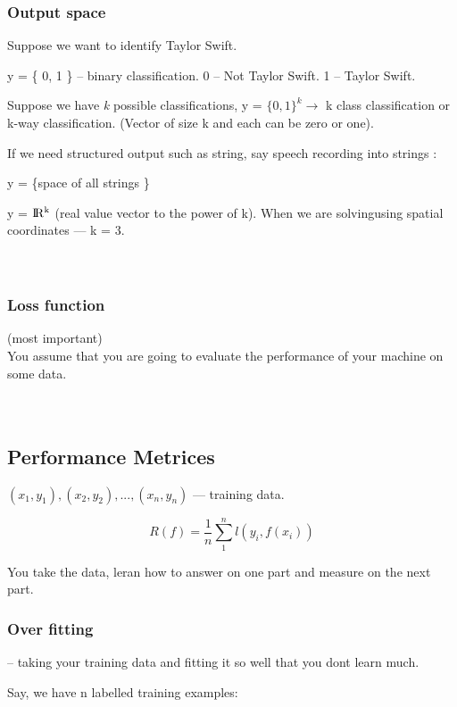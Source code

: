 \documentclass{article}
\begin{document}
\subsubsection*{Output space}

Suppose we want to identify Taylor Swift.

y = \{ 0, 1 \} -- binary classification.
0 -- Not Taylor Swift.
1 -- Taylor Swift.

Suppose we have \textit{k} possible classifications, 
y = \(\{0,1\}^{k} \to \) k class classification or k-way classification. (Vector of size k and each can be zero or one).


If we need structured output such as string, say speech recording into strings :

y = \{space of all strings \}

y = \( \rm I\!R^{k} \) (real value vector to the power of k).  When we are solvingusing spatial coordinates --- k = 3. \\\\\\
\subsubsection*{Loss function } (most important) \\
You assume that you are going to evaluate the performance of your machine on some data.\\\\\\
\subsection*{Performance Metrices}

\((x_{1}, y_{1}),(x_{2}, y_{2}), ... ,(x_{n}, y_{n}) \) --- training data.

\begin{equation}
	R(f) = \frac{1}{n} \sum_{1}^{n} l(y_{i}, f(x_{i}))
\end{equation}

You take the data, leran how to answer on one part and measure on the next part.

\subsubsection*{Over fitting} -- taking your training data and fitting it so well that you dont learn much.


Say, we have n labelled training examples:
\end{document}

